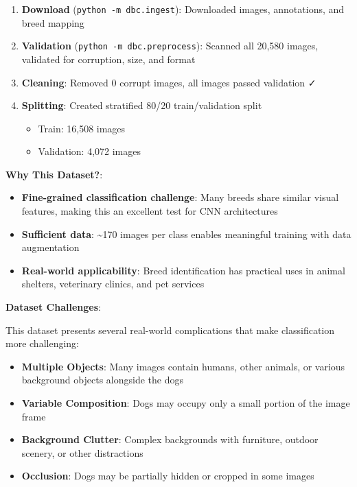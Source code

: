 \documentclass[
  letterpaper,
  DIV=11,
  numbers=noendperiod]{scrartcl}
\providecommand{\tightlist}{%
  \setlength{\itemsep}{0pt}\setlength{\parskip}{0pt}}
\begin{document}
\begin{enumerate}
\def\labelenumi{\arabic{enumi}.}
\tightlist
\item
  \textbf{Download} (\texttt{python\ -m\ dbc.ingest}): Downloaded
  images, annotations, and breed mapping
\item
  \textbf{Validation} (\texttt{python\ -m\ dbc.preprocess}): Scanned all
  20,580 images, validated for corruption, size, and format
\item
  \textbf{Cleaning}: Removed 0 corrupt images, all images passed
  validation ✓
\item
  \textbf{Splitting}: Created stratified 80/20 train/validation split

  \begin{itemize}
  \tightlist
  \item
    Train: 16,508 images
  \item
    Validation: 4,072 images
  \end{itemize}
\end{enumerate}

\textbf{Why This Dataset?}:

\begin{itemize}
\tightlist
\item
  \textbf{Fine-grained classification challenge}: Many breeds share
  similar visual features, making this an excellent test for CNN
  architectures
\item
  \textbf{Sufficient data}: \textasciitilde170 images per class enables
  meaningful training with data augmentation
\item
  \textbf{Real-world applicability}: Breed identification has practical
  uses in animal shelters, veterinary clinics, and pet services
\end{itemize}

\textbf{Dataset Challenges}:

This dataset presents several real-world complications that make
classification more challenging:

\begin{itemize}
\tightlist
\item
  \textbf{Multiple Objects}: Many images contain humans, other animals,
  or various background objects alongside the dogs
\item
  \textbf{Variable Composition}: Dogs may occupy only a small portion of
  the image frame
\item
  \textbf{Background Clutter}: Complex backgrounds with furniture,
  outdoor scenery, or other distractions
\item
  \textbf{Occlusion}: Dogs may be partially hidden or cropped in some
  images
\end{itemize}
\end{document}
